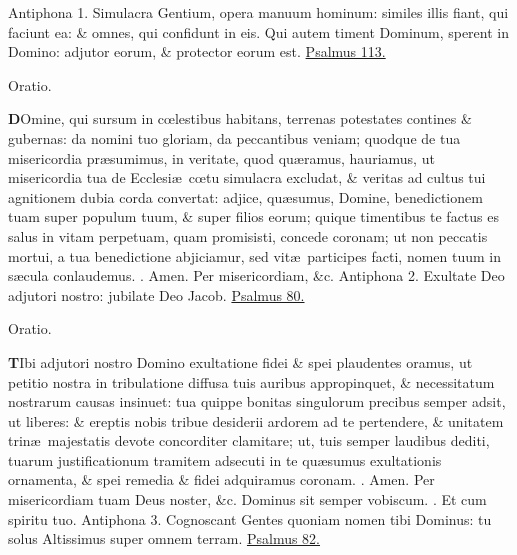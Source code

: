 \documentclass[letter,11pt]{book}
\makeatletter
\DeclareRobustCommand{\Rbar}{\vers@resp{0pt}{R}}
\newcommand{\vers@resp@sym}{\raisebox{0.2ex}{\rotatebox[origin=c]{-20}{$\m@th\rceil$}}}
\newcommand{\vers@resp}[2]{%
  {\ooalign{\hidewidth\kern#1\vers@resp@sym\hidewidth\cr#2\cr}}%
}%
\def\R{\color{Red} \Rbar . \color{black}}
\makeatother
\begin{document}
\begin{multicols*}{2}
\newline \color{Red} Antiphona 1. \color{black} Simulacra Gentium, opera manuum hominum: similes illis fiant, qui faciunt ea: \& omnes, qui confidunt in eis. Qui autem timent Dominum, sperent in Domino: adjutor eorum, \& protector eorum est. \color{Red} \hyperlink{ps113}{Psalmus 113.} \color{black}
\vspace{-.5em} \begin{center} \color{Red} Oratio. \color{black} \end{center} \vspace{-.5em}
\lettrine[lines=2]{\bfseries \color{Red} D}{}Omine, qui sursum in c\oe lestibus habitans, terrenas potestates contines \& gubernas: da nomini tuo gloriam, da peccantibus veniam; quodque de tua misericordia pr\ae sumimus, in veritate, quod qu\ae ramus, hauriamus, ut misericordia tua de Ecclesi\ae \ c\oe tu simulacra excludat, \& veritas ad cultus tui agnitionem dubia corda convertat: adjice, qu\ae sumus, Domine, benedictionem tuam super populum tuum, \& super filios eorum; quique timentibus te factus es salus in vitam perpetuam, quam promisisti, concede coronam; ut non peccatis mortui, a tua benedictione abjiciamur, sed vit\ae \ participes facti, nomen tuum in s\ae cula conlaudemus. \R Amen. Per misericordiam, \&c.
\newline \color{Red} Antiphona 2. \color{black} Exultate Deo adjutori nostro: jubilate Deo Jacob. \color{Red} \hyperlink{ps80}{Psalmus 80.} \color{black}
\vspace{-.5em} \begin{center} \color{Red} Oratio. \color{black} \end{center} \vspace{-.5em}
\lettrine[lines=2]{\bfseries \color{Red} T}{}Ibi adjutori nostro Domino exultatione fidei \& spei plaudentes oramus, ut petitio nostra in tribulatione diffusa tuis auribus appropinquet, \& necessitatum nostrarum causas insinuet: tua quippe bonitas singulorum precibus semper adsit, ut liberes: \& ereptis nobis tribue desiderii ardorem ad te pertendere, \& unitatem trin\ae \ majestatis devote concorditer clamitare; ut, tuis semper laudibus dediti, tuarum justificationum tramitem adsecuti in te qu\ae sumus exultationis ornamenta, \& spei remedia \& fidei adquiramus coronam. \R Amen. Per misericordiam tuam Deus noster, \&c. Dominus sit semper vobiscum. \R Et cum spiritu tuo.
\newline \color{Red} Antiphona 3. \color{black} Cognoscant Gentes quoniam nomen tibi Dominus: tu solus Altissimus super omnem terram. \color{Red} \hyperlink{ps82}{Psalmus 82.} \color{black}

\end{multicols*}
\end{document}
